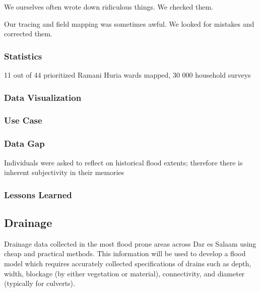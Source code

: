 \documentclass[a4paper,12pt,twoside]{article}
\begin{document}
We ourselves often wrote down ridiculous things. We checked them.

Our tracing and field mapping was sometimes awful. We looked for mistakes and corrected them.

\subsubsection{Statistics}
11 out of 44 prioritized Ramani Huria wards mapped, 30 000 household surveys

\subsubsection{Data Visualization}

\subsubsection{Use Case}

\subsubsection{Data Gap}
Individuals were asked to reflect on historical flood extents; therefore there is inherent subjectivity in their memories

\subsubsection{Lessons Learned}

\newpage
\subsection{Drainage}
Drainage data collected in the most flood prone areas across Dar es Salaam using cheap  and practical methods. This information will be used to develop a flood model which requires accurately collected specifications of drains such as depth, width, blockage (by either vegetation or material), connectivity, and diameter (typically for culverts).
\end{document}

